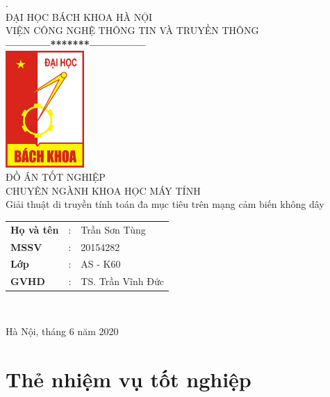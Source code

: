 \documentclass{hust}
\begin{document}
\thispagestyle{empty}

\thisfancypage{
	\setlength{\fboxrule}{1pt}
	\doublebox}{}
\begin{center}
	
	{
		. \\
		{\fontsize{12}{12}\selectfont ĐẠI HỌC BÁCH KHOA HÀ NỘI\\VIỆN CÔNG NGHỆ THÔNG TIN VÀ TRUYỀN THÔNG}\\
		\textbf{------------*******---------------}\\[1cm]
		\includegraphics[width=3cm]{logo}
		\centering
		\\[1cm]
		{\fontsize{25}{43}\selectfont ĐỒ ÁN TỐT NGHIỆP}\\[0.1cm]
		{\fontsize{17}{10}\selectfont CHUYÊN NGÀNH KHOA HỌC MÁY TÍNH}\\[0.9cm]
		{\fontsize{20}{26}\selectfont Giải thuật di truyền tính toán đa mục tiêu trên mạng cảm biến không dây}\\[2cm]
		
		\begin{tabular}{l c l}
			\textbf{Họ và tên} & : & Trần Sơn Tùng \\ 
			\textbf{MSSV} & : & 20154282  \\ 
			\textbf{Lớp} & : & AS - K60  \\
			\textbf{GVHD} & : &  TS. Trần Vĩnh Đức   \\
		\end{tabular} \\[1.5cm]
	}
	
	\fontsize{17}{19}\selectfont Hà Nội, tháng 6 năm 2020
\end{center}

\newpage

\thispagestyle{fancy}
\chapter*{Thẻ nhiệm vụ tốt nghiệp}
\end{document}
